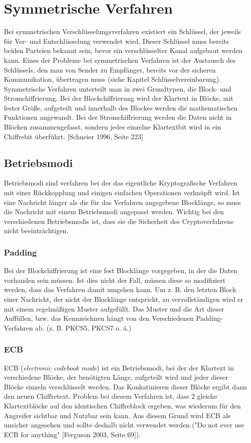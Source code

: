 \documentclass[10pt, a4paper,headsepline]{scrreprt}
\begin{document}
\section{Symmetrische Verfahren}
Bei symmetrischen Verschlüsselungsverfahren existiert ein Schlüssel, der jeweils für Ver- und Entschlüsselung verwendet wird. Dieser Schlüssel muss bereits beiden Parteien bekannt sein, bevor ein verschlüsselter Kanal aufgebaut werden kann. Eines der Probleme bei symmetrischen Verfahren ist der Austausch des Schlüssels, den man von Sender zu Empfänger, bereits vor der sicheren Kommunikation, übertragen muss (siehe Kapitel Schlüsselvereinbarung). Symmetrische Verfahren unterteilt man in zwei Grundtypen, die Block- und Stromchiffrierung. Bei der Blockchiffrierung wird der Klartext in Blöcke, mit fester Größe, aufgeteilt und innerhalb des Blockes werden die mathematischen Funktionen angewandt. Bei der Stromchiffrierung werden die Daten nicht in Blöcken zusammengefasst, sondern jedes einzelne Klartextbit wird in ein Chiffrebit überführt. [Schneier 1996, Seite 223] 

\subsection{Betriebsmodi}
Betriebsmodi sind verfahren bei der das eigentliche Kryptografische Verfahren mit einer Rückkopplung und einigen einfachen Operationen verknüpft wird. Ist eine Nachricht länger als die für das Verfahren angegebene Blocklänge, so muss die Nachricht mit einem Betriebsmodi angepasst werden. Wichtig bei den verschiedenen Betriebsmodis ist, dass sie die Sicherheit des Cryptoverfahrens nicht beeinträchtigen.

\subsubsection{Padding}
Bei der Blockchiffrierung ist eine fest Blocklänge vorgegeben, in der die Daten vorhanden sein müssen. Ist dies nicht der Fall, müssen diese so modifiziert werden, dass das Verfahren damit umgehen kann.
Um z. B. den letzten Block einer Nachricht, der nicht der Blocklänge entspricht, zu vervollständigen wird er mit einem regelmäßigen Muster aufgefüllt. Das Muster und die Art dieser Auffüllen, bzw. das Kennzeichnen hängt von den Verschiedenen Padding-Verfahren ab. (z. B. PKCS5, PKCS7 o. ä.)

\subsubsection{ECB}
ECB (\textit{electronic codebook mode}) ist ein Betriebsmodi, bei der der Klartext in verschiedene Blöcke, der benötigten Länge, aufgeteilt wird und jeder dieser Blöcke einzeln verschlüsselt werden. Das Konkatinieren dieser Blöcke ergibt dann den neuen Chiffretext. Problem bei diesem Verfahren ist, dass 2 gleiche Klartextblöcke auf den identischen Chiffreblock ergeben, was wiederum für den Angreifer sichtbar und Nutzbar sein kann. Aus diesem Grund wird ECB als unsicher angesehen und sollte deshalb nicht verwendet werden ("Do not ever use ECB for anything" [Ferguson 2003, Seite 69]).
\end{document}
